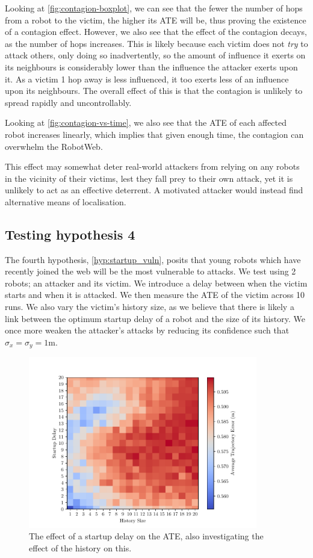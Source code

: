 Looking at \ref{fig:contagion-boxplot}, we can see that the fewer the number of hops from a robot to the victim, the higher its ATE will be, thus proving the existence of a contagion effect. However, we also see that the effect of the contagion decays, as the number of hops increases. This is likely because each victim does not \textit{try} to attack others, only doing so inadvertently, so the amount of influence it exerts on its neighbours is considerably lower than the influence the attacker exerts upon it. As a victim 1 hop away is less influenced, it too exerts less of an influence upon its neighbours. The overall effect of this is that the contagion is unlikely to spread rapidly and uncontrollably.

Looking at \ref{fig:contagion-vs-time}, we also see that the ATE of each affected robot increases linearly, which implies that given enough time, the contagion can overwhelm the RobotWeb.

This effect may somewhat deter real-world attackers from relying on any robots in the vicinity of their victims, lest they fall prey to their own attack, yet it is unlikely to act as an effective deterrent. A motivated attacker would instead find alternative means of localisation.

\subsection{Testing hypothesis 4}
The fourth hypothesis, \ref{hyp:startup_vuln}, posits that young robots which have recently joined the web will be the most vulnerable to attacks. We test using 2 robots; an attacker and its victim. We introduce a delay between when the victim starts and when it is attacked. We then measure the ATE of the victim across 10 runs. We also vary the victim's history size, as we believe that there is likely a link between the optimum startup delay of a robot and the size of its history. We once more weaken the attacker's attacks by reducing its confidence such that $\sigma_x = \sigma_y = 1$m.


\begin{figure}[!h]
	\centering
	\includegraphics[width=10cm]{graphs/startup_delay.pdf}
	\caption{The effect of a startup delay on the ATE, also investigating the effect of the history on this.}
	\label{fig:startup_delay}
\end{figure}

